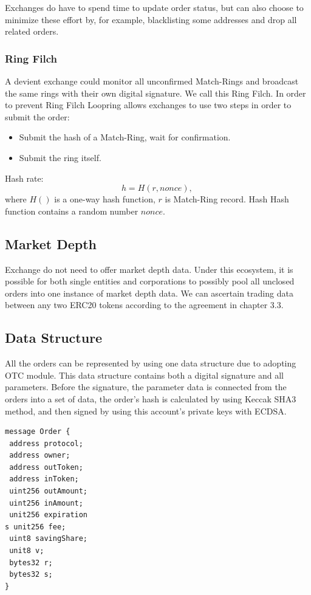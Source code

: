 \documentclass[UTF8,nofonts]{article}
\begin{document}
Exchanges do have to spend time to update order status, but can also choose to minimize these effort by, for example, blacklisting some addresses and drop all related orders.

\subsubsection{Ring Filch}

A devient exchange could monitor all unconfirmed Match-Rings and broadcast the same rings with their own digital signature. We call this Ring Filch. In order to prevent Ring Filch Loopring allows exchanges to use two steps in order to submit the order: 
\begin{itemize}
  \item Submit the hash of a Match-Ring, wait for confirmation.
  \item Submit the ring itself.
\end{itemize}
Hash rate:
$$h = H(r,  nonce)\text{, }$$
where $H()$ is a one-way hash function, $r$ is Match-Ring record. Hash Hash function contains a random number $nonce$.

\subsection{Market Depth\label{sec: marketdepth}}

Exchange do not need to offer market depth data. Under this ecosystem, it is possible for both single entities and corporations to possibly pool all unclosed orders into one instance of market depth data. We can ascertain trading data between any two ERC20 tokens according to the agreement in chapter 3.3.

\subsection{Data Structure\label{sec: dataformat}}

All the orders can be represented by using one data structure due to adopting OTC module. This data structure contains both a digital signature and all parameters. Before the signature, the parameter data is connected from the orders into a set of data, the order's hash is calculated by using Keccak SHA3 method, and then signed by using this account's private keys with ECDSA.


\begin{verbatim}
message Order {
 address protocol;
 address owner;
 address outToken;
 address inToken;
 uint256 outAmount;
 uint256 inAmount;
 unit256 expiration
s unit256 fee;
 uint8 savingShare;
 unit8 v;
 bytes32 r;
 bytes32 s;
}
\end{verbatim}
\end{document}
